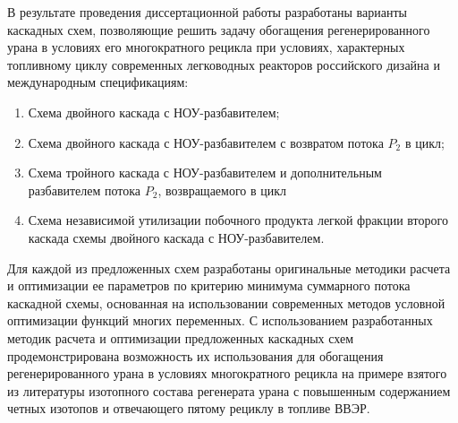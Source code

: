 
В результате проведения диссертационной работы разработаны варианты каскадных схем, позволяющие решить задачу обогащения регенерированного урана в условиях его многократного рецикла при условиях, характерных топливному циклу современных легководных реакторов российского дизайна и международным спецификациям:

\begin{enumerate}
  \item Схема двойного каскада с НОУ-разбавителем;
  \item Схема двойного каскада с НОУ-разбавителем с возвратом потока $P_2$ в цикл;
  \item Схема тройного каскада с НОУ-разбавителем и дополнительным разбавителем потока $P_2$, возвращаемого в цикл
  \item Схема независимой утилизации побочного продукта легкой фракции второго каскада схемы двойного каскада с НОУ-разбавителем.
\end{enumerate}

Для каждой из предложенных схем разработаны оригинальные методики расчета и оптимизации ее параметров по критерию минимума суммарного потока каскадной схемы, основанная на использовании современных методов условной оптимизации функций многих переменных. С использованием разработанных методик расчета и оптимизации предложенных каскадных схем продемонстрирована возможность их использования для обогащения регенерированного урана в условиях многократного рецикла на примере взятого из литературы изотопного состава регенерата урана с повышенным содержанием четных изотопов и отвечающего пятому рециклу в топливе ВВЭР.

